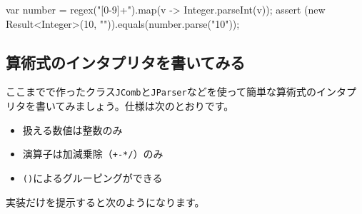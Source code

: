 \begin{codescreen}{}
var number = regex("[0-9]+").map(v -> Integer.parseInt(v));
assert (new Result<Integer>(10, "")).equals(number.parse("10"));
\end{codescreen}

\subsection{算術式のインタプリタを書いてみる}

ここまでで作ったクラス\texttt{JComb}と\texttt{JParser}などを使って簡単な算術式のインタプリタを書いてみましょう。仕様は次のとおりです。

\begin{itemize}
\item
  扱える数値は整数のみ
\item
  演算子は加減乗除（\texttt{+\textbar{}-\textbar{}*\textbar{}/}）のみ
\item
  \texttt{()}によるグルーピングができる
\end{itemize}

実装だけを提示すると次のようになります。

